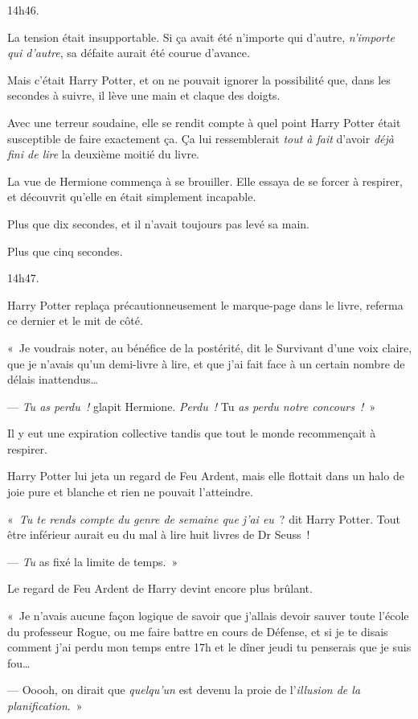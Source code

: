 14h46.

La tension était insupportable. Si ça avait été n'importe qui d'autre, \emph{n'importe qui d'autre}, sa défaite aurait été courue d'avance.

Mais c'était Harry Potter, et on ne pouvait ignorer la possibilité que, dans les secondes à suivre, il lève une main et claque des doigts.

Avec une terreur soudaine, elle se rendit compte à quel point Harry Potter était susceptible de faire exactement ça. Ça lui ressemblerait \emph{tout à fait} d'avoir \emph{déjà fini de lire} la deuxième moitié du livre.

La vue de Hermione commença à se brouiller. Elle essaya de se forcer à respirer, et découvrit qu'elle en était simplement incapable.

Plus que dix secondes, et il n'avait toujours pas levé sa main.

Plus que cinq secondes.

14h47.

Harry Potter replaça précautionneusement le marque-page dans le livre, referma ce dernier et le mit de côté.

«~Je voudrais noter, au bénéfice de la postérité, dit le Survivant d'une voix claire, que je n'avais qu'un demi-livre à lire, et que j'ai fait face à un certain nombre de délais inattendus…

--- \emph{Tu as perdu~!} glapit Hermione. \emph{Perdu~!} Tu \emph{as perdu notre concours~!}~»

Il y eut une expiration collective tandis que tout le monde recommençait à respirer.

Harry Potter lui jeta un regard de Feu Ardent, mais elle flottait dans un halo de joie pure et blanche et rien ne pouvait l'atteindre.

«~\emph{Tu te rends compte du genre de semaine que j'ai eu}~? dit Harry Potter. Tout être inférieur aurait eu du mal à lire huit livres de Dr Seuss~!

--- \emph{Tu} as fixé la limite de temps.~»

Le regard de Feu Ardent de Harry devint encore plus brûlant.

«~Je n'avais aucune façon logique de savoir que j'allais devoir sauver toute l'école du professeur Rogue, ou me faire battre en cours de Défense, et si je te disais comment j'ai perdu mon temps entre 17h et le dîner jeudi tu penserais que je suis fou…

--- Ooooh, on dirait que \emph{quelqu'un} est devenu la proie de l'\emph{illusion de la planification}.~»

